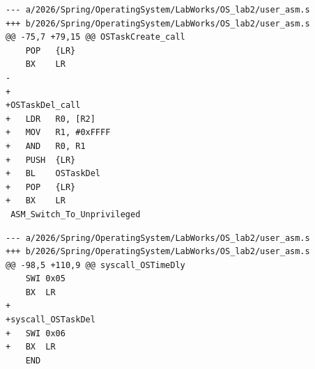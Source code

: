 \documentclass[12pt,a4paper]{article}
\begin{document}
\begin{lstlisting}[style=diffstyle,caption={user\_asm.s --- hunk -75 +79}]
--- a/2026/Spring/OperatingSystem/LabWorks/OS_lab2/user_asm.s
+++ b/2026/Spring/OperatingSystem/LabWorks/OS_lab2/user_asm.s
@@ -75,7 +79,15 @@ OSTaskCreate_call
 	POP   {LR}
 	BX    LR
-
+
+OSTaskDel_call
+	LDR   R0, [R2]
+	MOV   R1, #0xFFFF
+	AND   R0, R1
+	PUSH  {LR}
+	BL    OSTaskDel
+	POP   {LR}
+	BX    LR
 ASM_Switch_To_Unprivileged
\end{lstlisting}

\begin{lstlisting}[style=diffstyle,caption={user\_asm.s --- hunk -98 +110}]
--- a/2026/Spring/OperatingSystem/LabWorks/OS_lab2/user_asm.s
+++ b/2026/Spring/OperatingSystem/LabWorks/OS_lab2/user_asm.s
@@ -98,5 +110,9 @@ syscall_OSTimeDly
 	SWI 0x05
 	BX  LR
+
+syscall_OSTaskDel
+	SWI 0x06
+	BX  LR
 	END
\end{lstlisting}
\end{document}
